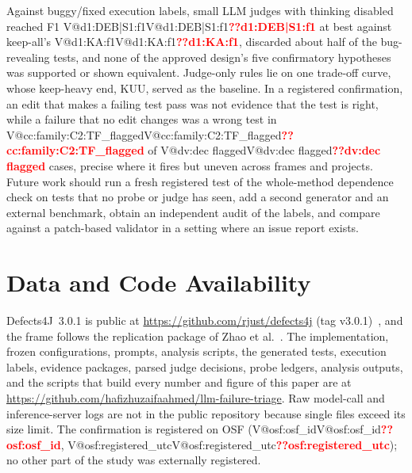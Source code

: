 \documentclass[journal]{IEEEtran}
\makeatletter
\newcommand{\V}[1]{\ifcsname V@#1\endcsname\csname V@#1\endcsname\else\textbf{\textcolor{red}{??#1}}\fi}
\makeatother
\begin{document}
Against buggy/fixed execution labels, small LLM judges with thinking disabled reached F1 \V{d1:DEB|S1:f1} at best against keep-all's \V{d1:KA:f1}, discarded about half of the bug-revealing tests, and none of the approved design's five confirmatory hypotheses was supported or shown equivalent. Judge-only rules lie on one trade-off curve, whose keep-heavy end, KUU, served as the baseline. In a registered confirmation, an edit that makes a failing test pass was not evidence that the test is right, while a failure that no edit changes was a wrong test in \V{cc:family:C2:TF_flagged} of \V{dv:dec flagged} cases, precise where it fires but uneven across frames and projects. Future work should run a fresh registered test of the whole-method dependence check on tests that no probe or judge has seen, add a second generator and an external benchmark, obtain an independent audit of the labels, and compare against a patch-based validator in a setting where an issue report exists.

\section*{Data and Code Availability}
Defects4J~3.0.1 is public at \url{https://github.com/rjust/defects4j} (tag v3.0.1)~\cite{defects4j301}, and the frame follows the replication package of Zhao et al.~\cite{zhao2026replication}. The implementation, frozen configurations, prompts, analysis scripts, the generated tests, execution labels, evidence packages, parsed judge decisions, probe ledgers, analysis outputs, and the scripts that build every number and figure of this paper are at \url{https://github.com/hafizhuzaifaahmed/llm-failure-triage}. Raw model-call and inference-server logs are not in the public repository because single files exceed its size limit. The confirmation is registered on OSF (\V{osf:osf_id}, \V{osf:registered_utc}); no other part of the study was externally registered.



\end{document}

